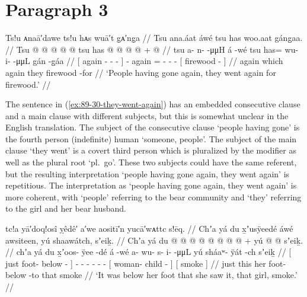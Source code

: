\section{Paragraph 3}

\ex\label{ex:89-30-they-went-again}%
%
\begingl
	\glpreamble	Ts!u ᴀnaā′dawe ts!u hᴀs wuā′t g̣ᴀ′ng̣a //
	\glpreamble	Tsu ana.áat áwé tsu has woo.aat gáng̱aa. //
	\gla	{} Tsu  @ {} @ {} @ {} @ {} {}  @ {}
		tsu has @  @ {} @ {} @ {} +
		{}  @ {} {} //
	\glb	{} tsu a- n-  -μμH {} {} á -wé
		tsu has= wu- i-  -μμL
		{} gán -g̱áa {} //
	\glc	{}[ again - -  - \· {}]  -
		again = - -  -
		{}[ firewood - {}] //
	\gld	{} again  {} {} {} \·which {}  {}
		again they  {} {} {}
		{} firewood -for {} //
	\glft	‘People having gone again, they went again for firewood.’
		//
\endgl
\xe

The sentence in (\ref{ex:89-30-they-went-again}) has an embedded consecutive clause and a main clause with different subjects, but this is somewhat unclear in the English translation.
The subject of the consecutive clause  ‘people having gone’ is the fourth person (indefinite) human  ‘someone, people’.
The subject of the main clause  ‘they went’ is a covert third person which is pluralized by the modifier  as well as the plural root  ‘pl.\ go’.
These two subjects could have the same referent, but the resulting interpretation ‘people having gone again, they went again’ is repetitious.
The interpretation as ‘people having gone again, they went again’ is more coherent, with ‘people’ referring to the bear community and ‘they’ referring to the girl and her bear husband.

\ex\label{ex:89-31-she-saw-smoke}%
%
\begingl
	\glpreamble	tc!a yā′doq!osî ỵêdê′ a′we aositī′n yucā′wᴀttc s!ēq. //
	\glpreamble	Chʼa yá du x̱ʼusÿeedé áwé awsiteen, yú shaawátch, sʼeiḵ. //
	\gla	{} Chʼa yá du  @ {} @ {} {}  @ {}
		 @ {} @ {} @ {} @ {} @ {} +
		{} yú  @ {} @ {} {}
		{} sʼeiḵ. {} //
	\glb	{} chʼa yá du x̱ʼoos- ÿee -dé {} á -wé
		a- wu- s- i-  -μμL
		{} yú sháaʷ- ÿát -ch {}
		{} sʼeiḵ {} //
	\glc	{}[ just   foot- below - {}]  -
		- - - -  -
		{}[  woman- child - {}]
		{}[ smoke {}] //
	\gld	{} just this her foot- below -to {}  {}
		 {} {} {} {} {}
		{} that  {} {} {}
		{} smoke {} //
	\glft	‘It was below her foot that she saw it, that girl, smoke.’
		//
\endgl
\xe

